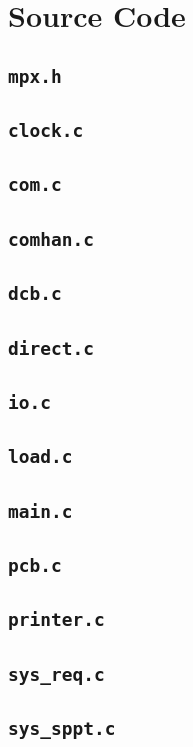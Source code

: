 \chapter{Source Code}
\label{source_code}

\section{\tt mpx.h}


\section{\tt clock.c}


\section{\tt com.c}


\section{\tt comhan.c}


\section{\tt dcb.c}


\section{\tt direct.c}


\section{\tt io.c}


\section{\tt load.c}


\section{\tt main.c}


\section{\tt pcb.c}


\section{\tt printer.c}


\section{\tt sys\_req.c}


\section{\tt sys\_sppt.c}

